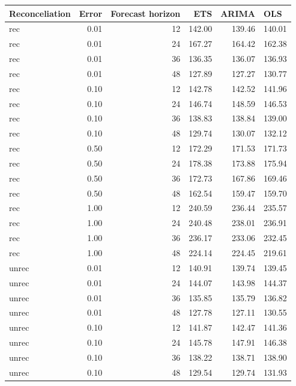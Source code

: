 \documentclass[11pt,a4paper,]{article}
\let\origtable\table
\let\endorigtable\endtable
\renewenvironment{table}[1][2] {
    \expandafter\origtable\expandafter[!htbp]
} {
    \endorigtable
}
\begin{document}
\begin{table}[!h]

\caption{\label{tab:TourismdatasimrollingnoiseFH}Mean(RMSE) on one to four year test set with different error levels for ETS, ARIMA and OLS with and without reconciliation - Rolling origin - 304 bottom level series and 8 levels of hierarchy - Simulated tourism dataset}
\centering
\begin{tabular}[t]{lrrrrl}
\toprule
Reconceliation & Error & Forecast horizon & ETS & ARIMA & OLS\\
\midrule
rec & 0.01 & 12 & 142.00 & 139.46 & 140.01\\
rec & 0.01 & 24 & 167.27 & 164.42 & 162.38\\
rec & 0.01 & 36 & 136.35 & 136.07 & 136.93\\
rec & 0.01 & 48 & 127.89 & 127.27 & 130.77\\
rec & 0.10 & 12 & 142.78 & 142.52 & 141.96\\
rec & 0.10 & 24 & 146.74 & 148.59 & 146.53\\
rec & 0.10 & 36 & 138.83 & 138.84 & 139.00\\
rec & 0.10 & 48 & 129.74 & 130.07 & 132.12\\
rec & 0.50 & 12 & 172.29 & 171.53 & 171.73\\
rec & 0.50 & 24 & 178.38 & 173.88 & 175.94\\
rec & 0.50 & 36 & 172.73 & 167.86 & 169.46\\
rec & 0.50 & 48 & 162.54 & 159.47 & 159.70\\
rec & 1.00 & 12 & 240.59 & 236.44 & 235.57\\
rec & 1.00 & 24 & 240.48 & 238.01 & 236.91\\
rec & 1.00 & 36 & 236.17 & 233.06 & 232.45\\
rec & 1.00 & 48 & 224.14 & 224.45 & 219.61\\
unrec & 0.01 & 12 & 140.91 & 139.74 & 139.45\\
unrec & 0.01 & 24 & 144.07 & 143.98 & 144.37\\
unrec & 0.01 & 36 & 135.85 & 135.79 & 136.82\\
unrec & 0.01 & 48 & 127.78 & 127.11 & 130.55\\
unrec & 0.10 & 12 & 141.87 & 142.47 & 141.36\\
unrec & 0.10 & 24 & 145.78 & 147.91 & 146.38\\
unrec & 0.10 & 36 & 138.22 & 138.71 & 138.90\\
unrec & 0.10 & 48 & 129.54 & 129.74 & 131.93\\

\end{tabular}
\end{table}
\end{document}
